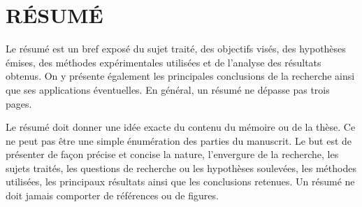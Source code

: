 %
\chapter*{RÉSUMÉ}\thispagestyle{headings}

Le résumé est un bref exposé du sujet traité, des objectifs visés, des hypothèses émises, des méthodes expérimentales utilisées et de l'analyse des résultats obtenus. On y présente également les principales conclusions de la recherche ainsi que ses applications éventuelles. En général, un résumé ne dépasse pas trois pages.

Le résumé doit donner une idée exacte du contenu du mémoire ou de la thèse. Ce ne peut pas être une simple énumération des parties du manuscrit. Le but est de présenter de façon précise et concise la nature, l’envergure de la recherche, les sujets traités, les questions de recherche ou les hypothèses soulevées, les méthodes utilisées, les principaux résultats ainsi que les conclusions retenues. Un résumé ne doit jamais comporter de références ou de figures. 

